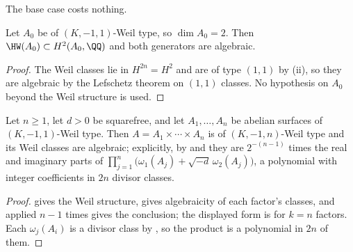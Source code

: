The base case costs nothing.

\begin{lemma}\label{lem:basecase}
Let $A_{0}$ be of $(K,-1,1)$-Weil type, so $\dim A_{0}=2$. Then
$\HW(A_{0})\subset H^{2}(A_{0},\QQ)$ and both generators are algebraic.
\end{lemma}

\begin{proof}
The Weil classes lie in $H^{2n}=H^{2}$ and are of type $(1,1)$ by
(ii), so they are algebraic by the Lefschetz theorem on
$(1,1)$ classes. No hypothesis on $A_{0}$ beyond the Weil structure is used.
\end{proof}

\begin{theorem}\label{thm:everyn}
Let $n\ge1$, let $d>0$ be squarefree, and let $A_{1},\dots,A_{n}$ be abelian
surfaces of $(K,-1,1)$-Weil type. Then $A=A_{1}\times\cdots\times A_{n}$ is of
$(K,-1,n)$-Weil type and its Weil classes are algebraic; explicitly, by
 and  they are
$2^{-(n-1)}$ times the real and imaginary parts of
$\prod_{j=1}^{n}\bigl(\omega_{1}(A_{j})+\sqrt{-d}\,\omega_{2}(A_{j})\bigr)$,
a polynomial with integer coefficients in $2n$ divisor classes.
\end{theorem}

\begin{proof}
 gives the Weil structure,  gives
algebraicity of each factor's classes, and  applied $n-1$
times gives the conclusion; the displayed form is  for $k=n$
factors. Each $\omega_{j}(A_{i})$ is a divisor class by
, so the product is a polynomial in $2n$ of them.
\end{proof}

